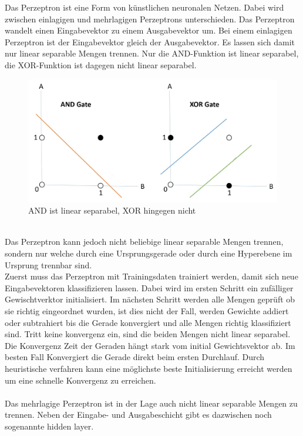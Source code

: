 Das Perzeptron ist eine Form von künstlichen neuronalen Netzen. Dabei wird zwischen einlagigen und mehrlagigen Perzeptrons unterschieden.  Das Perzeptron wandelt einen Eingabevektor zu einem Ausgabevektor um. Bei einem einlagigen Perzeptron ist der Eingabevektor gleich der Ausgabevektor. Es lassen sich damit nur linear separable Mengen trennen. Nur die AND-Funktion ist linear separabel, die XOR-Funktion ist dagegen nicht linear separabel. 
\begin{figure}[h]
	\includegraphics[width=1\linewidth]{Bilder/perzeptron_and_xor}
	\caption{AND ist linear separabel, XOR hingegen nicht}\label{Perzeptron}
\end{figure}
\\
Das Perzeptron kann jedoch nicht beliebige linear separable Mengen trennen, sondern nur welche durch eine Ursprungsgerade oder durch eine Hyperebene im Ursprung trennbar sind.
\\
 Zuerst muss das Perzeptron mit Trainingsdaten trainiert werden, damit sich neue Eingabevektoren klassifizieren lassen. Dabei wird im ersten Schritt ein zufälliger Gewischtverktor initialisiert. Im nächsten Schritt werden alle Mengen geprüft ob sie richtig eingeordnet wurden, ist dies nicht der Fall, werden Gewichte addiert oder subtrahiert bis die Gerade konvergiert und alle Mengen richtig klassifiziert sind. Tritt keine konvergenz ein, sind die beiden Mengen nicht linear separabel. Die Konvergenz Zeit der Geraden hängt stark vom initial Gewichtsvektor ab. Im besten Fall Konvergiert die Gerade direkt beim ersten Durchlauf. Durch heuristische verfahren kann eine möglichste beste Initialisierung erreicht werden um eine schnelle Konvergenz zu erreichen. 
\\\\
Das mehrlagige Perzeptron ist in der Lage auch nicht linear separable Mengen zu trennen. Neben der Eingabe- und Ausgabeschicht gibt es dazwischen noch sogenannte hidden layer.
